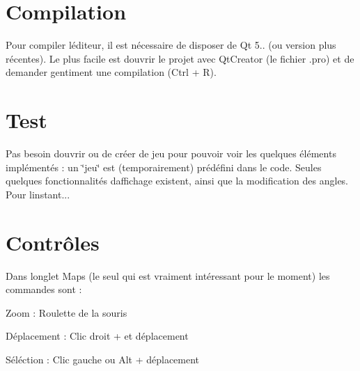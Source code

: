 \section*{Compilation}

Pour compiler l\textquotesingle{}éditeur, il est nécessaire de disposer de Qt 5.. (ou version plus récentes). Le plus facile est d\textquotesingle{}ouvrir le projet avec Qt\+Creator (le fichier .pro) et de demander gentiment une compilation (Ctrl + R).

\section*{Test}

Pas besoin d\textquotesingle{}ouvrir ou de créer de jeu pour pouvoir voir les quelques éléments implémentés \+: un \char`\"{}jeu\char`\"{} est (temporairement) prédéfini dans le code. Seules quelques fonctionnalités d\textquotesingle{}affichage existent, ainsi que la modification des angles. Pour l\textquotesingle{}instant...

\section*{Contrôles}

Dans l\textquotesingle{}onglet Maps (le seul qui est vraiment intéressant pour le moment) les commandes sont \+:

Zoom \+: Roulette de la souris

Déplacement \+: Clic droit + et déplacement

Séléction \+: Clic gauche ou Alt + déplacement 